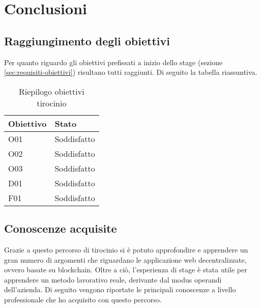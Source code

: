 
\chapter{Conclusioni}
\label{cap:conclusioni}

\section{Raggiungimento degli obiettivi}
Per quanto riguardo gli obiettivi prefissati a inizio dello stage (sezione \ref{sec:requisiti-obiettivi}) risultano tutti raggiunti. Di seguito la tabella riassuntiva.

\begin{longtable}[c]{|p{3cm} p{3cm}|}
\caption{Riepilogo obiettivi tirocinio}
\label{tab:obiettivi-tirocinio}
\\ \hline
\rowcolor{gray!40}
\textbf{Obiettivo} &
\textbf{Stato} \\ \hline
\endhead

O01 & Soddisfatto \\ \hline

O02 & Soddisfatto \\ \hline

O03 & Soddisfatto \\ \hline

D01 & Soddisfatto \\ \hline

F01 & Soddisfatto \\ \hline

\end{longtable}

\section{Conoscenze acquisite}
Grazie a questo percorso di tirocinio si è potuto approfondire e apprendere un gran numero di argomenti che riguardano le applicazione web decentralizzate, ovvero basate su blockchain. Oltre a ciò, l'esperienza di stage è stata utile per apprendere un metodo lavorativo reale, derivante dal modus operandi dell'azienda. Di seguito vengono riportate le principali conoscenze a livello professionale che ho acquisito con questo percorso.

